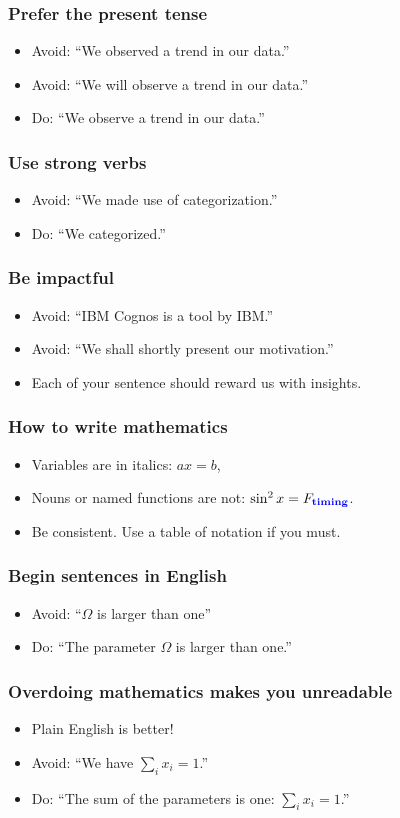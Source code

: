 \documentclass[handout]{beamer}
\newcommand{\important}[1]{\textcolor{blue}{\textbf{#1}}}
\begin{document}
\frame
{
  \frametitle{Prefer the present tense}
  \begin{itemize}
  \item<1-> Avoid: ``We observed a trend in our data.''
  \item<1-> Avoid: ``We will observe a trend in our data.''
   \item<2-> Do: ``We observe a trend in our data.''
 \end{itemize}
 }


\frame
{
  \frametitle{Use strong verbs}
  \begin{itemize}
  \item<1-> Avoid: ``We made use of categorization.''
  \item<2-> Do: ``We categorized.''
 \end{itemize}
 }

\frame
{
  \frametitle{Be impactful}
  \begin{itemize}
  \item<1-> Avoid: ``IBM Cognos is a tool by IBM.''
  \item<2-> Avoid: ``We shall shortly present our motivation.''
  \item<3-> Each of your sentence should reward us with insights.

 \end{itemize}
 }



\frame
{
  \frametitle{How to write mathematics}
  \begin{itemize}
  \item<1->  Variables are in italics: $a x = b$,
  \item<2-> Nouns or named functions are not: $\sin^2 x = F_{\textrm{\important{timing}}}$.
  \item<3->  Be consistent. Use a table of notation if you must.
  \end{itemize}
}

\frame
{
  \frametitle{Begin sentences in English}
  \begin{itemize}
  \item<1->  Avoid: ``$\Omega$ is larger than one''
  \item<2->  Do: ``The parameter $\Omega$ is larger than one.''
    \end{itemize}
}

\frame
{
  \frametitle{Overdoing mathematics makes you unreadable}
  \begin{itemize}
  \item<1->  Plain English is better!
  \item<2-> Avoid:  ``We have $\sum_i x_i=1$.''
  \item<3-> Do:  ``The sum of the parameters is one: $\sum_i x_i=1$.''
  \end{itemize}
}
\end{document}
